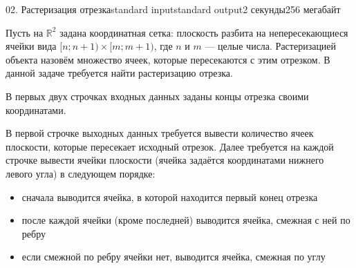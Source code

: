 \begin{problem}{02. Растеризация отрезка}{standard input}{standard output}{2 секунды}{256 мегабайт}

Пусть на $\mathbb R^2$ задана координатная сетка: плоскость разбита на непересекающиеся ячейки вида $[n; n + 1) \times [m; m + 1)$, где $n$ и $m$ --- целые числа. Растеризацией объекта назовём множество ячеек, которые пересекаются с этим отрезком. В данной задаче требуется найти растеризацию отрезка.

\InputFile

В первых двух строчках входных данных заданы концы отрезка своими координатами.

\OutputFile

В первой строчке выходных данных требуется вывести количество ячеек плоскости, которые пересекает исходный отрезок. Далее требуется на каждой строчке вывести ячейки плоскости (ячейка задаётся координатами нижнего левого угла) в следующем порядке:
\begin{itemize}
\item сначала выводится ячейка, в которой находится первый конец отрезка
\item после каждой ячейки (кроме последней) выводится ячейка, смежная с ней по ребру
\item если смежной по ребру ячейки нет, выводится ячейка, смежная по углу
\end{itemize}

\Examples

\begin{example}%
%
%
\end{example}

\end{problem}
